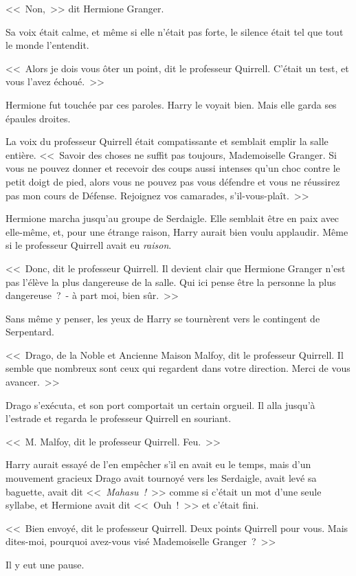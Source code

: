 <<~Non,~>> dit Hermione Granger.

Sa voix était calme, et même si elle n'était pas forte, le silence était tel que tout le monde l'entendit.

<<~Alors je dois vous ôter un point, dit le professeur Quirrell. C'était un test, et vous l'avez échoué.~>>

Hermione fut touchée par ces paroles. Harry le voyait bien. Mais elle garda ses épaules droites.

La voix du professeur Quirrell était compatissante et semblait emplir la salle entière. <<~Savoir des choses ne suffit pas toujours, Mademoiselle Granger. Si vous ne pouvez donner et recevoir des coups aussi intenses qu'un choc contre le petit doigt de pied, alors vous ne pouvez pas vous défendre et vous ne réussirez pas mon cours de Défense. Rejoignez vos camarades, s'il-vous-plaît.~>>

Hermione marcha jusqu'au groupe de Serdaigle. Elle semblait être en paix avec elle-même, et, pour une étrange raison, Harry aurait bien voulu applaudir. Même si le professeur Quirrell avait eu \emph{raison}.

<<~Donc, dit le professeur Quirrell. Il devient clair que Hermione Granger n'est pas l'élève la plus dangereuse de la salle. Qui ici pense être la personne la plus dangereuse~?~- à part moi, bien sûr.~>>

Sans même y penser, les yeux de Harry se tournèrent vers le contingent de Serpentard.

<<~Drago, de la Noble et Ancienne Maison Malfoy, dit le professeur Quirrell. Il semble que nombreux sont ceux qui regardent dans votre direction. Merci de vous avancer.~>>

Drago s'exécuta, et son port comportait un certain orgueil. Il alla jusqu'à l'estrade et regarda le professeur Quirrell en souriant.

<<~M. Malfoy, dit le professeur Quirrell. Feu.~>>

Harry aurait essayé de l'en empêcher s'il en avait eu le temps, mais d'un mouvement gracieux Drago avait tournoyé vers les Serdaigle, avait levé sa baguette, avait dit <<~\emph{Mahasu~!}~>> comme si c'était un mot d'une seule syllabe, et Hermione avait dit <<~Ouh~!~>> et c'était fini.

<<~Bien envoyé, dit le professeur Quirrell. Deux points Quirrell pour vous. Mais dites-moi, pourquoi avez-vous visé Mademoiselle Granger~?~>>

Il y eut une pause.

